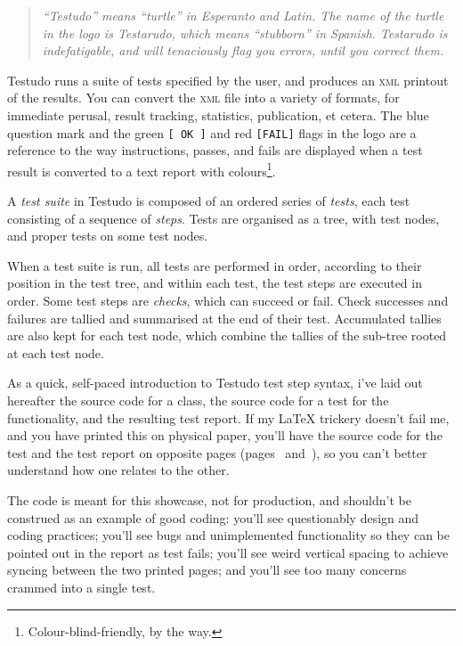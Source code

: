 \documentclass[twoside, a4paper, article]{memoir}
\begin{document}
\vspace{1\baselineskip}

\begin{quote}
  \emph{``Testudo'' means ``turtle'' in Esperanto and Latin.  The name of the
    turtle in the logo is Testarudo, which means ``stubborn'' in Spanish.
    Testarudo is indefatigable, and will tenaciously flag you errors, until you
    correct them.}
\end{quote}

\vspace{1\baselineskip}

Testudo runs a suite of tests specified by the user, and produces an
\textsc{xml} printout of the results.  You can convert the \textsc{xml} file
into a variety of formats, for immediate perusal, result tracking, statistics,
publication, et cetera.  The blue question mark and the green \verb|[ OK ]| and
red \verb|[FAIL]| flags in the logo are a reference to the way instructions,
passes, and fails are displayed when a test result is converted to a text
report with colours\footnote{Colour-blind-friendly, by the way.}.

A \emph{test suite} in Testudo is composed of an ordered series of
\emph{tests}, each test consisting of a sequence of \emph{steps}.  Tests are
organised as a tree, with test nodes, and proper tests on some test nodes.

When a test suite is run, all tests are performed in order, according to their
position in the test tree, and within each test, the test steps are executed in
order.  Some test steps are \emph{checks}, which can succeed or fail.  Check
successes and failures are tallied and summarised at the end of their test.
Accumulated tallies are also kept for each test node, which combine the tallies
of the sub-tree rooted at each test node.

As a quick, self-paced introduction to Testudo test step syntax, i've laid out
hereafter the source code for a class, the source code for a test for the
functionality, and the resulting test report.  If my \LaTeX{} trickery doesn't
fail me, and you have printed this on physical paper, you'll have the source
code for the test and the test report on opposite pages
(pages~\pageref{pag:example-test-code} and~\pageref{pag:example-test-report}),
so you can't better understand how one relates to the other.

The code is meant for this showcase, not for production, and shouldn't be
construed as an example of good coding: you'll see questionably design and
coding practices; you'll see bugs and unimplemented functionality so they can
be pointed out in the report as test fails; you'll see weird vertical spacing
to achieve syncing between the two printed pages; and you'll see too many
concerns crammed into a single test.
\end{document}
